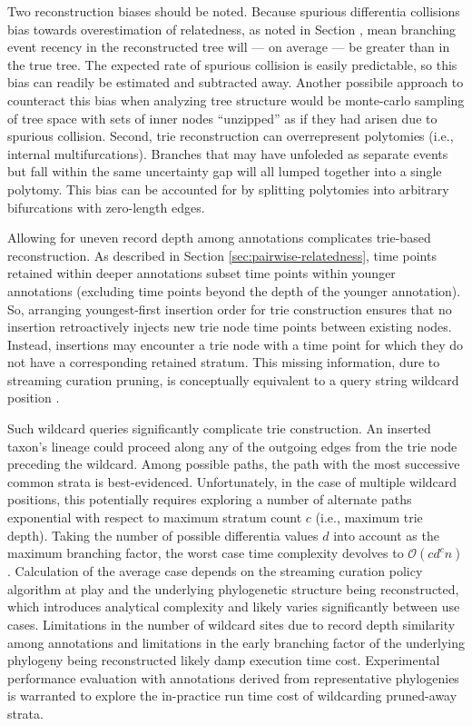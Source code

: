 Two reconstruction biases should be noted.  
Because spurious differentia collisions bias towards overestimation of relatedness, as noted in Section , mean branching event recency in the reconstructed tree will --- on average --- be greater than in the true tree.
The expected rate of spurious collision is easily predictable, so this bias can readily be estimated and subtracted away.
Another possibile approach to counteract this bias when analyzing tree structure would be monte-carlo sampling of tree space with sets of inner nodes ``unzipped'' as if they had arisen due to spurious collision.    
Second, trie reconstruction can overrepresent polytomies (i.e., internal multifurcations).
Branches that may have unfoleded as separate events but fall within the same uncertainty gap will all lumped together into a single polytomy.
This bias can be accounted for by splitting polytomies into arbitrary bifurcations with zero-length edges.

Allowing for uneven record depth among annotations complicates trie-based reconstruction.
As described in Section \ref{sec:pairwise-relatedness}, time points retained within deeper annotations subset time points within younger annotations (excluding time points beyond the depth of the younger annotation).
So, arranging youngest-first insertion order for trie construction ensures that no insertion retroactively injects new trie node time points between existing nodes.
Instead, insertions may encounter a trie node with a time point for which they do not have a corresponding retained stratum.
This missing information, dure to streaming curation pruning, is conceptually equivalent to a query string wildcard position \citep{fukuyama2016partial}.

Such wildcard queries significantly complicate trie construction.
An inserted taxon's lineage could proceed along any of the outgoing edges from the trie node preceding the wildcard.
Among possible paths, the path with the most successive common strata is best-evidenced.
Unfortunately, in the case of multiple wildcard positions, this  potentially requires exploring a number of alternate paths exponential with respect to maximum stratum count $c$ (i.e., maximum trie depth).
Taking the number of possible differentia values $d$ into account as the maximum branching factor, the worst case time complexity devolves to $\mathcal{O}(c d^c n)$ \citep{fukuyama2016partial}.
Calculation of the average case depends on the streaming curation policy algorithm at play and the underlying phylogenetic structure being reconstructed, which introduces analytical complexity and likely varies significantly between use cases.
Limitations in the number of wildcard sites due to record depth similarity among annotations and limitations in the early branching factor of the underlying phylogeny being reconstructed likely damp execution time cost.
Experimental performance evaluation with annotations derived from representative phylogenies is warranted to explore the in-practice run time cost of wildcarding pruned-away strata.




